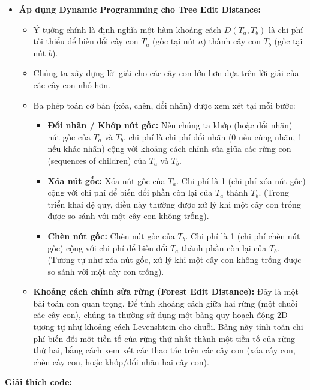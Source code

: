 \documentclass{article}
\begin{document}
\begin{itemize}
    \item \textbf{Áp dụng Dynamic Programming cho Tree Edit Distance:}
    \begin{itemize}
        \item Ý tưởng chính là định nghĩa một hàm khoảng cách $D(T_a, T_b)$ là chi phí tối thiểu để biến đổi cây con $T_a$ (gốc tại nút $a$) thành cây con $T_b$ (gốc tại nút $b$).
        \item Chúng ta xây dựng lời giải cho các cây con lớn hơn dựa trên lời giải của các cây con nhỏ hơn.
        \item Ba phép toán cơ bản (xóa, chèn, đổi nhãn) được xem xét tại mỗi bước:
            \begin{itemize}
                \item \textbf{Đổi nhãn / Khớp nút gốc:} Nếu chúng ta khớp (hoặc đổi nhãn) nút gốc của $T_a$ và $T_b$, chi phí là chi phí đổi nhãn (0 nếu cùng nhãn, 1 nếu khác nhãn) cộng với khoảng cách chỉnh sửa giữa các rừng con (sequences of children) của $T_a$ và $T_b$.
                \item \textbf{Xóa nút gốc:} Xóa nút gốc của $T_a$. Chi phí là 1 (chi phí xóa nút gốc) cộng với chi phí để biến đổi phần còn lại của $T_a$ thành $T_b$. (Trong triển khai đệ quy, điều này thường được xử lý khi một cây con trống được so sánh với một cây con không trống).
                \item \textbf{Chèn nút gốc:} Chèn nút gốc của $T_b$. Chi phí là 1 (chi phí chèn nút gốc) cộng với chi phí để biến đổi $T_a$ thành phần còn lại của $T_b$. (Tương tự như xóa nút gốc, xử lý khi một cây con không trống được so sánh với một cây con trống).
            \end{itemize}
        \item \textbf{Khoảng cách chỉnh sửa rừng (Forest Edit Distance):} Đây là một bài toán con quan trọng. Để tính khoảng cách giữa hai rừng (một chuỗi các cây con), chúng ta thường sử dụng một bảng quy hoạch động 2D tương tự như khoảng cách Levenshtein cho chuỗi. Bảng này tính toán chi phí biến đổi một tiền tố của rừng thứ nhất thành một tiền tố của rừng thứ hai, bằng cách xem xét các thao tác trên các cây con (xóa cây con, chèn cây con, hoặc khớp/đổi nhãn hai cây con).
    \end{itemize}
\end{itemize}

\textbf{Giải thích code:}
\end{document}
